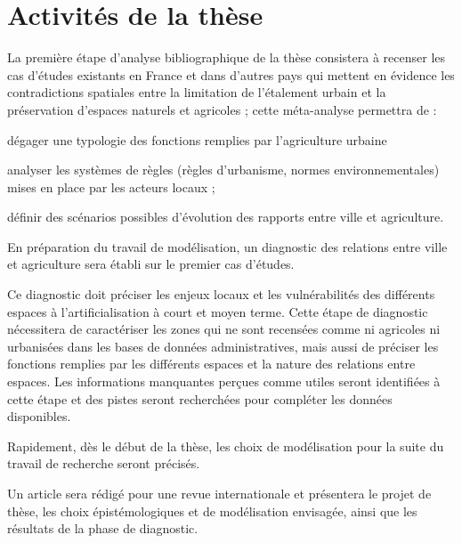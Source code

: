 \section[planning]{Activités de la thèse}

\subject{1ère année}

\startitemize[n]

\item	La première étape d'analyse bibliographique de la thèse
	consistera à recenser les cas d'études existants en France et dans d'autres pays
	qui mettent en évidence les contradictions spatiales entre la limitation de l'étalement urbain
	et la préservation d'espaces naturels et agricoles ;
	cette méta-analyse permettra de :

	\startitemize[a,packed]

	\item dégager une typologie des fonctions remplies par l'agriculture urbaine
	\item analyser les systèmes de règles (règles d'urbanisme,
		normes environnementales) mises en place par les acteurs locaux ;
		\item définir des scénarios possibles d'évolution
	  des rapports entre ville et agriculture.

	\stopitemize

\item	En préparation du travail de modélisation,
	un diagnostic des relations entre ville et agriculture
	sera établi sur le premier cas d'études.

	Ce diagnostic doit préciser les enjeux locaux
	et les vulnérabilités des différents espaces
	à l'artificialisation à court et moyen terme.
	Cette étape de diagnostic nécessitera de caractériser les zones
	qui ne sont recensées comme ni agricoles ni urbanisées
	dans les bases de données administratives,
	mais aussi de préciser les fonctions remplies par les différents espaces
	et la nature des relations entre espaces.
	Les informations manquantes perçues comme utiles
	seront identifiées à cette étape et des pistes seront recherchées
	pour compléter les données disponibles.

\item Rapidement, dès le début de la thèse,
	les choix de modélisation pour la suite du travail de recherche
	seront précisés.

\item Un article sera rédigé pour une revue internationale
   et présentera le projet de thèse,
   les choix épistémologiques et de modélisation envisagée,
   ainsi que les résultats de la phase de diagnostic.

